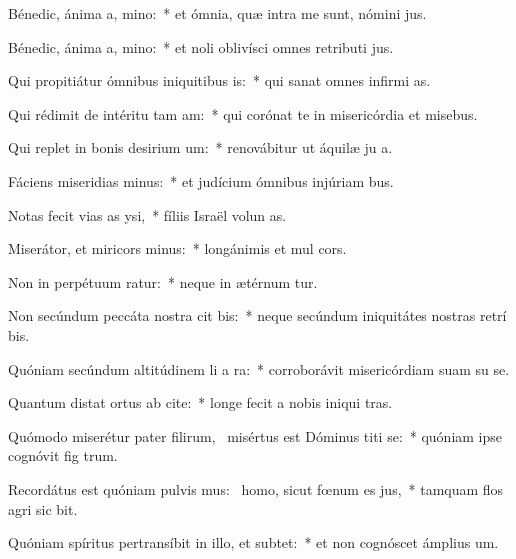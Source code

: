 \item Bénedic, ánima a, mino:~* et ómnia, quæ intra me sunt, nómini  jus.
\item Bénedic, ánima a, mino:~* et noli oblivísci omnes retributi jus.
\item Qui propitiátur ómnibus iniquitibus is:~* qui sanat omnes infirmi as.
\item Qui rédimit de intéritu tam am:~* qui corónat te in misericórdia et misebus.
\item Qui replet in bonis desirium um:~* renovábitur ut áquilæ ju a.
\item Fáciens miseridias minus:~* et judícium ómnibus injúriam bus.
\item Notas fecit vias as ysi,~* fíliis Israël volun as.
\item Miserátor, et miricors minus:~* longánimis et mul cors.
\item Non in perpétuum ratur:~* neque in ætérnum tur.
\item Non secúndum peccáta nostra cit bis:~* neque secúndum iniquitátes nostras retrí bis.
\item Quóniam secúndum altitúdinem li a ra:~* corroborávit misericórdiam suam su  se.
\item Quantum distat ortus ab cite:~* longe fecit a nobis iniqui tras.
\item Quómodo miserétur pater filirum,~\pscross{} misértus est Dóminus titi se:~* quóniam ipse cognóvit fig trum.
\item Recordátus est quóniam pulvis mus:~\pscross{} homo, sicut fœnum es jus,~* tamquam flos agri sic bit.
\item Quóniam spíritus pertransíbit in illo, et  subtet:~* et non cognóscet ámplius  um.
